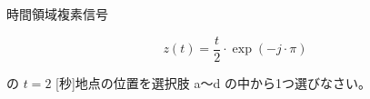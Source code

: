 時間領域複素信号 

\[
z(t) = \frac{t}{2} \cdot \exp(-j \cdot \pi) 
\]

\medskip
\noindent の $t = 2$ [秒]地点の位置を選択肢 a〜d の中から1つ選びなさい。
